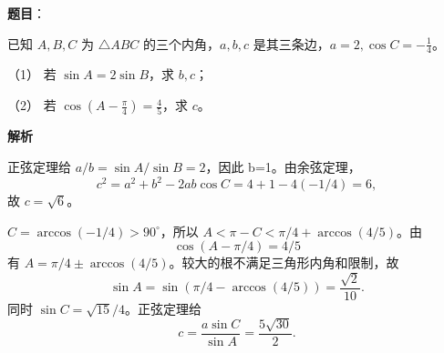 \begin{answer}

\textbf{题目}：

已知 $A,B,C$ 为 $\triangle ABC$ 的三个内角，$a,b,c$ 是其三条边，$a=2,\cos C=-\frac14$。

（1） 若 $\sin A=2\sin B$，求 $b,c$；

（2） 若 $\cos(A-\frac\pi4)=\frac45$，求 $c$。

\textbf{解析}


正弦定理给 \(a/b=\sin A/\sin B=2\)，因此 b=1。由余弦定理，
\nopagebreak[4]
\[
c^2=a^2+b^2-2ab\cos C=4+1-4(-1/4)=6,
\]
故 $c=\sqrt6$。


\(C=\arccos(-1/4)>90^\circ\)，所以 \(A<\pi-C<\pi/4+\arccos(4/5)\)。由
\nopagebreak[4]
\[
\cos(A-\pi/4)=4/5
\]
有 \(A=\pi/4\pm\arccos(4/5)\)。较大的根不满足三角形内角和限制，故
\nopagebreak[4]
\[
\sin A=\sin(\pi/4-\arccos(4/5))=\frac{\sqrt2}{10}.
\]
同时 \(\sin C=\sqrt{15}/4\)。正弦定理给
\nopagebreak[4]
\[
c=\frac{a\sin C}{\sin A}=\frac{5\sqrt{30}}2.
\]



\end{answer}

